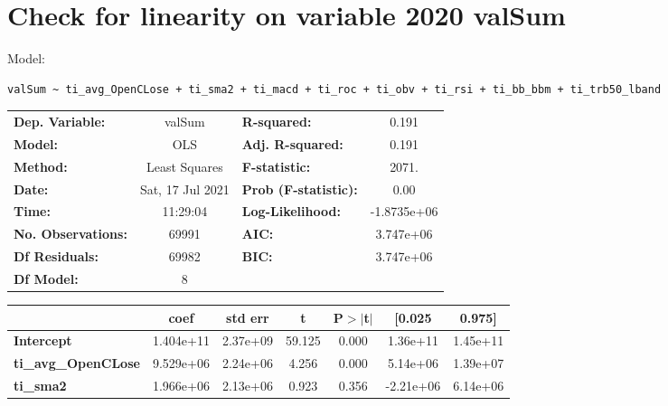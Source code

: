 \section{Check for linearity on variable 2020 valSum}

Model: \begin{verbatim}valSum ~ ti_avg_OpenCLose + ti_sma2 + ti_macd + ti_roc + ti_obv + ti_rsi + ti_bb_bbm + ti_trb50_lband\end{verbatim}

\begin{center}
\begin{tabular}{lclc}
\toprule
\textbf{Dep. Variable:}     &      valSum      & \textbf{  R-squared:         } &      0.191   \\
\textbf{Model:}             &       OLS        & \textbf{  Adj. R-squared:    } &      0.191   \\
\textbf{Method:}            &  Least Squares   & \textbf{  F-statistic:       } &      2071.   \\
\textbf{Date:}              & Sat, 17 Jul 2021 & \textbf{  Prob (F-statistic):} &      0.00    \\
\textbf{Time:}              &     11:29:04     & \textbf{  Log-Likelihood:    } & -1.8735e+06  \\
\textbf{No. Observations:}  &       69991      & \textbf{  AIC:               } &  3.747e+06   \\
\textbf{Df Residuals:}      &       69982      & \textbf{  BIC:               } &  3.747e+06   \\
\textbf{Df Model:}          &           8      & \textbf{                     } &              \\
\bottomrule
\end{tabular}
\begin{tabular}{lcccccc}
                            & \textbf{coef} & \textbf{std err} & \textbf{t} & \textbf{P$> |$t$|$} & \textbf{[0.025} & \textbf{0.975]}  \\
\midrule
\textbf{Intercept}          &    1.404e+11  &     2.37e+09     &    59.125  &         0.000        &     1.36e+11    &     1.45e+11     \\
\textbf{ti\_avg\_OpenCLose} &    9.529e+06  &     2.24e+06     &     4.256  &         0.000        &     5.14e+06    &     1.39e+07     \\
\textbf{ti\_sma2}           &    1.966e+06  &     2.13e+06     &     0.923  &         0.356        &    -2.21e+06    &     6.14e+06     \\

\end{tabular}
\end{center}
